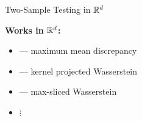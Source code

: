 \documentclass[aspectratio=169, 10pt]{beamer}
\begin{document}
\begin{frame}{Two-Sample Testing in $\mathbb{R}^d$}

  \textbf{Works in $\mathbb{R}^d$:}
  \begin{itemize}
    \setlength\itemsep{0.5em}
    \item \textcite{gretton2012kernel} — maximum mean discrepancy
    \item \textcite{wang2021two} — kernel projected Wasserstein
    \item \textcite{hu2025two} — max-sliced Wasserstein
    \item[] $\vdots$
  \end{itemize}


\end{frame}
\end{document}
